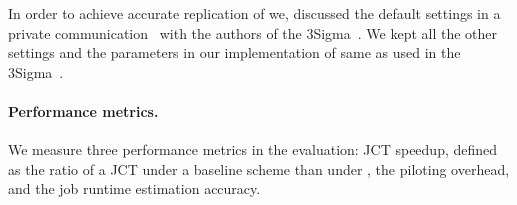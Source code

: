 In order to achieve accurate replication of \primarybasepredict we, discussed
the default settings in a private
communication~\cite{personalCommunication:JunWoo} with the authors of the
3Sigma~\cite{3Sigma}.  We kept all the other settings and the parameters in
our implementation of \primarybasepredict same as used in the
3Sigma~\cite{3Sigma}. 
\fi



\paragraph{Performance metrics.}
We measure three performance metrics in the
evaluation: JCT speedup, defined as the ratio of a JCT under a baseline
scheme than under \slearn, the piloting overhead, and the job runtime
estimation accuracy.

